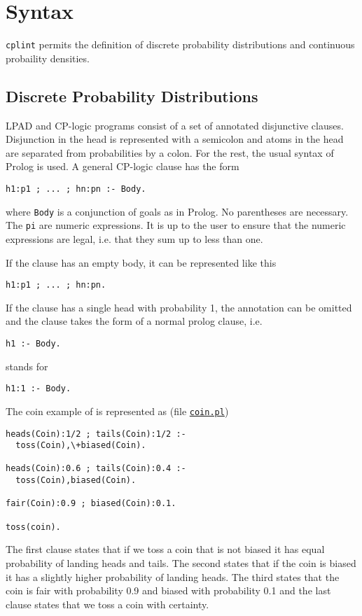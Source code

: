 \section{Syntax}
\label{syn}
\texttt{cplint} permits the definition of discrete probability distributions and continuous probaility
densities.
\subsection{Discrete Probability Distributions}
\label{discrete}
LPAD and CP-logic programs consist of a set of annotated disjunctive clauses.
Disjunction in the head is represented with a semicolon and atoms in the head are separated from probabilities by a colon. For the rest, the usual syntax of Prolog is used.
A general CP-logic clause has the form
\begin{verbatim}
h1:p1 ; ... ; hn:pn :- Body.
\end{verbatim}
where \verb|Body| is a conjunction of goals as in Prolog.
 No parentheses are necessary. The \texttt{pi} are numeric expressions. It is up to the user to ensure that the numeric expressions are legal, i.e. that they sum up to less than one.

If the clause has an empty body, it can be represented like this
\begin{verbatim}
h1:p1 ; ... ; hn:pn.
\end{verbatim}
If the clause has a single head with probability 1, the annotation can be omitted and the clause takes the form of a normal prolog clause, i.e. 
\begin{verbatim}
h1 :- Body.
\end{verbatim}
stands for 
\begin{verbatim}
h1:1 :- Body.
\end{verbatim}
The coin example of  \cite{VenVer04-ICLP04-IC} is represented as (file \href{http://cplint.lamping.unife.it/example/inference/coin.pl}{\texttt{coin.pl}})
\begin{verbatim}
heads(Coin):1/2 ; tails(Coin):1/2 :- 
  toss(Coin),\+biased(Coin).

heads(Coin):0.6 ; tails(Coin):0.4 :- 
  toss(Coin),biased(Coin).

fair(Coin):0.9 ; biased(Coin):0.1.

toss(coin).
\end{verbatim}
The first clause states that if we toss a coin that is not biased it has equal probability of landing heads and tails. The second states that if the coin is biased it has a slightly higher probability of landing heads. The third states that the coin is fair with probability 0.9 and biased with probability 0.1 and the last clause states that we toss a coin with certainty.

